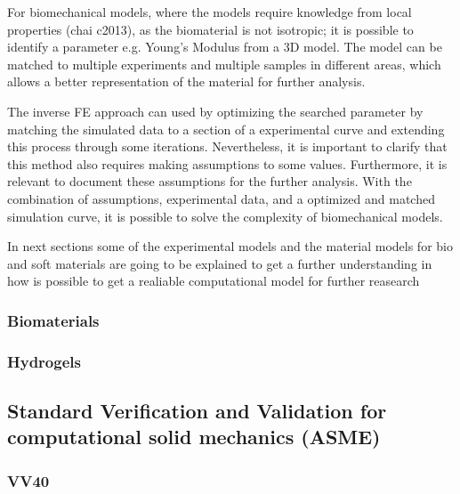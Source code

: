 For biomechanical models, where the models require knowledge from local properties (chai c2013),
as the biomaterial is not isotropic; it is possible to identify a parameter e.g. Young's Modulus 
from a 3D model. The model can be matched to multiple experiments and multiple samples in different areas,
which allows a better representation of the material for further analysis.

The inverse FE approach can used by optimizing the searched parameter by matching the simulated data
to a section of a experimental curve and extending this process through some iterations. 
Nevertheless, it is important to clarify that this method also requires making assumptions to some values.
Furthermore, it is relevant to document these assumptions for the further analysis. 
With the combination of assumptions, experimental data, and a optimized and matched simulation curve, it
is possible to solve the complexity of biomechanical models.
 
In next sections some of the experimental models and the material models for bio and soft materials are 
going to be explained to get a further understanding in how is possible to get a realiable computational 
model for further reasearch

\subsubsection{Biomaterials}

\subsubsection{Hydrogels}

\subsection{Standard Verification and Validation for computational solid mechanics (ASME)}
\subsubsection{VV40}


